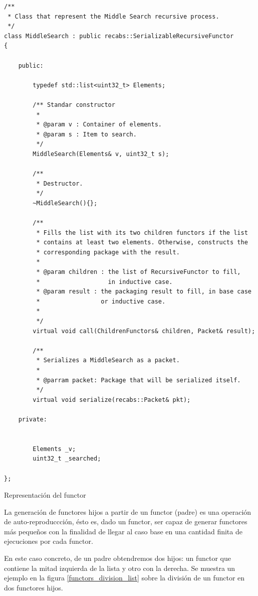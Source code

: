 \begin{table}[ht]
    \lstset{language=C++}
    \begin{lstlisting}[frame=single]
/** 
 * Class that represent the Middle Search recursive process.
 */
class MiddleSearch : public recabs::SerializableRecursiveFunctor
{

    public:
        
        typedef std::list<uint32_t> Elements;

        /** Standar constructor
         * 
         * @param v : Container of elements.
         * @param s : Item to search.
         */
        MiddleSearch(Elements& v, uint32_t s);

        /**
         * Destructor.
         */
        ~MiddleSearch(){};

        /**
         * Fills the list with its two children functors if the list
         * contains at least two elements. Otherwise, constructs the
         * corresponding package with the result.
         *
         * @param children : the list of RecursiveFunctor to fill,
         *                   in inductive case.
         * @param result : the packaging result to fill, in base case
         *                 or inductive case.
         *
         */
        virtual void call(ChildrenFunctors& children, Packet& result);

        /**
         * Serializes a MiddleSearch as a packet.
         *
         * @parram packet: Package that will be serialized itself.
         */        
        virtual void serialize(recabs::Packet& pkt);

    private:


        Elements _v;
        uint32_t _searched;

};
    \end{lstlisting}
    \centering
    \caption{Representación del functor}
    \label{middle_search}
\end{table}

La generación de functores hijos a partir de un functor (padre) es una operación de auto-reproduccción, ésto es, dado un functor, ser capaz
de generar functores más pequeños con la finalidad de llegar al caso base en una cantidad finita de ejecuciones por cada functor.

En este caso concreto, de un padre obtendremos dos hijos: un functor que contiene la mitad izquierda de la lista y otro con la derecha. Se
muestra un ejemplo en la figura \ref{functors_division_list} sobre la división de un functor en dos functores hijos.\\

